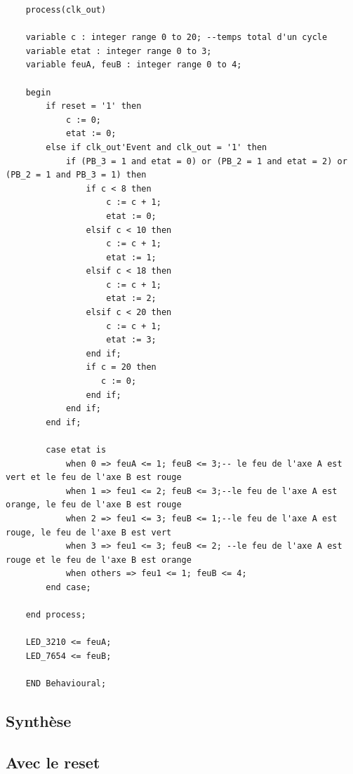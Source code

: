 \documentclass[11pt]{report}
\begin{document}
\begin{lstlisting}
	process(clk_out)

	variable c : integer range 0 to 20; --temps total d'un cycle
	variable etat : integer range 0 to 3;
	variable feuA, feuB : integer range 0 to 4;

	begin
		if reset = '1' then
			c := 0;
			etat := 0;
		else if clk_out'Event and clk_out = '1' then
			if (PB_3 = 1 and etat = 0) or (PB_2 = 1 and etat = 2) or (PB_2 = 1 and PB_3 = 1) then
				if c < 8 then
					c := c + 1;
					etat := 0;
				elsif c < 10 then
					c := c + 1;
					etat := 1;
				elsif c < 18 then
					c := c + 1;
					etat := 2;
				elsif c < 20 then
					c := c + 1;
					etat := 3;
				end if;
				if c = 20 then
				   c := 0;
				end if;
			end if;
		end if;

		case etat is
			when 0 => feuA <= 1; feuB <= 3;-- le feu de l'axe A est vert et le feu de l'axe B est rouge
			when 1 => feu1 <= 2; feuB <= 3;--le feu de l'axe A est orange, le feu de l'axe B est rouge
			when 2 => feu1 <= 3; feuB <= 1;--le feu de l'axe A est rouge, le feu de l'axe B est vert
			when 3 => feu1 <= 3; feuB <= 2; --le feu de l'axe A est rouge et le feu de l'axe B est orange
			when others => feu1 <= 1; feuB <= 4;
		end case;

	end process;

	LED_3210 <= feuA;
	LED_7654 <= feuB;

	END Behavioural;
  \end{lstlisting}
  
  \subsection{Synthèse}
  
  
  \subsection{Avec le reset}
  
  
\end{document}
